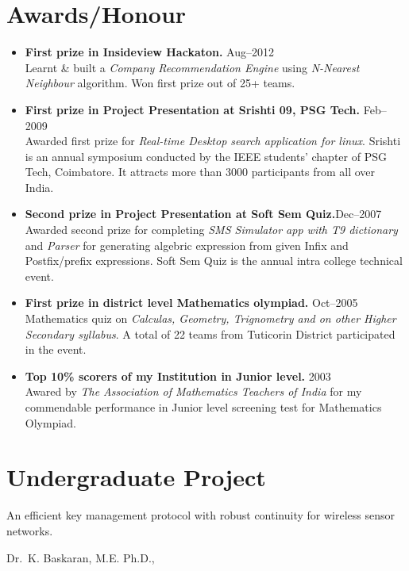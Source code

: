 \documentclass{cv}
\begin{document}
\section{Awards/Honour}
\begin{itemize}[label={$\ast$}]
  \item \textbf{First prize in Insideview Hackaton.} \hfill Aug--2012\\
    Learnt \& built a \textit{Company Recommendation Engine} using \textit{N-Nearest Neighbour} algorithm.  Won first prize out of 25+ teams.
  \item \textbf{First prize in Project Presentation at Srishti 09, PSG Tech.} \hfill Feb--2009\\
    Awarded first prize for \textit{Real-time Desktop search application for linux}. Srishti is an annual symposium conducted by the IEEE students' chapter of PSG Tech, Coimbatore.  It attracts more than 3000 participants from all over India.
  \item \textbf{Second prize in Project Presentation at Soft Sem Quiz.}\hfill Dec--2007\\
    Awarded second prize for completing \textit{SMS Simulator app with T9 dictionary} and \textit{Parser} for generating algebric expression from given Infix and Postfix/prefix expressions.  Soft Sem Quiz is the annual intra college technical event.
  \item \textbf{First prize in district level Mathematics olympiad.} \hfill Oct--2005\\
    Mathematics quiz on \textit{Calculas, Geometry, Trignometry and on other Higher Secondary syllabus}.  A total of 22 teams from Tuticorin District participated in the event.
  \item \textbf{Top 10\% scorers of my Institution in Junior level.} \hfill 2003\\
    Awared by \textit{The Association of Mathematics Teachers of India} for my commendable performance in Junior level screening test for Mathematics Olympiad.
\end{itemize}

\section{Undergraduate Project}
\begin{description}[leftmargin=50pt,labelwidth=50pt]
  \item[Title] An efficient key management protocol with robust continuity for wireless sensor networks.
  \item[Guide] Dr.\ K. Baskaran, M.E. Ph.D.,
\end{description}
\end{document}

